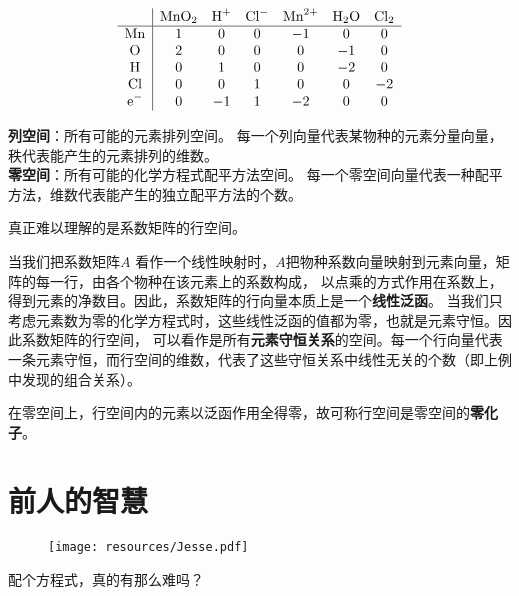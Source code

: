 \documentclass{ctexart}
\begin{document}
\noindent
\begin{minipage}[c]{0.5\textwidth}
    \[
        \begin{array}{c|*{5}{c}c}
            & \ce{MnO2} & \ce{H+} &\ce{Cl-} &\ce{Mn^2+} &\ce{H2O} &\ce{Cl2} \\
            \hline
            \ce{Mn} & 1 & 0 & 0 & -1 & 0 & 0\\
            \ce{O} & 2 & 0 & 0 & 0 & -1 & 0\\
            \ce{H} & 0 & 1 & 0 & 0 & -2 & 0\\
            \ce{Cl} & 0 & 0 & 1 & 0 & 0 & -2\\
            \ce{e^-} & 0 & -1 & 1 & -2 & 0 & 0\\
        \end{array}
    \]
\end{minipage}%
\hfill
\begin{minipage}[c]{0.45\textwidth}
    \textbf{列空间}：所有可能的元素排列空间。
    每一个列向量代表某物种的元素分量向量，秩代表能产生的元素排列的维数。
    \\[1em]
    \textbf{零空间}：所有可能的化学方程式配平方法空间。
    每一个零空间向量代表一种配平方法，维数代表能产生的独立配平方法的个数。
\end{minipage}
\vspace{1em}

真正难以理解的是系数矩阵的行空间。

当我们把系数矩阵\(A\) 看作一个线性映射时，\(A\)把物种系数向量映射到元素向量，矩阵的每一行，由各个物种在该元素上的系数构成，
以点乘的方式作用在系数上，得到元素的净数目。因此，系数矩阵的行向量本质上是一个\textbf{线性泛函}。
当我们只考虑元素数为零的化学方程式时，这些线性泛函的值都为零，也就是元素守恒。因此系数矩阵的行空间，
可以看作是所有\textbf{元素守恒关系}的空间。每一个行向量代表一条元素守恒，而行空间的维数，代表了这些守恒关系中线性无关的个数（即上例中发现的组合关系）。

在零空间上，行空间内的元素以泛函作用全得零，故可称行空间是零空间的\textbf{零化子}。

\section{前人的智慧}

\begin{figure}[H]
    \centering
    \texttt{[image: resources/Jesse.pdf]}
\end{figure}
配个方程式，真的有那么难吗？
\end{document}
